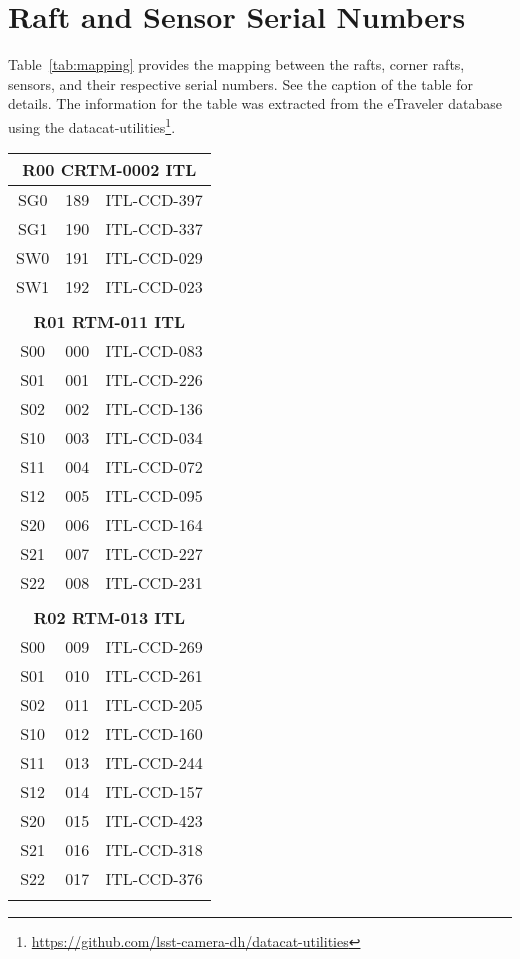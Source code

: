 \appendix
\section{Raft and Sensor Serial Numbers}
Table~\ref{tab:mapping} provides the mapping between the rafts, corner rafts, sensors, and their respective serial numbers.  See the caption of the table for details.  The information for the table was extracted from the eTraveler database using the datacat-utilities\footnote{\url{https://github.com/lsst-camera-dh/datacat-utilities}}.

\begin{longtable}{ccc}

\multicolumn{3}{c}{\bf R00  CRTM-0002  ITL} \\
\hline
  SG0 & 189 & ITL-CCD-397 \\
  SG1 & 190 & ITL-CCD-337 \\
  SW0 & 191 & ITL-CCD-029 \\
  SW1 & 192 & ITL-CCD-023 \\
 & & \\
\multicolumn{3}{c}{\bf R01  RTM-011  ITL} \\
\hline
  S00 & 000 & ITL-CCD-083 \\
  S01 & 001 & ITL-CCD-226 \\
  S02 & 002 & ITL-CCD-136 \\
  S10 & 003 & ITL-CCD-034 \\
  S11 & 004 & ITL-CCD-072 \\
  S12 & 005 & ITL-CCD-095 \\
  S20 & 006 & ITL-CCD-164 \\
  S21 & 007 & ITL-CCD-227 \\
  S22 & 008 & ITL-CCD-231 \\
 & & \\
\multicolumn{3}{c}{\bf R02  RTM-013  ITL} \\
\hline
  S00 & 009 & ITL-CCD-269 \\
  S01 & 010 & ITL-CCD-261 \\
  S02 & 011 & ITL-CCD-205 \\
  S10 & 012 & ITL-CCD-160 \\
  S11 & 013 & ITL-CCD-244 \\
  S12 & 014 & ITL-CCD-157 \\
  S20 & 015 & ITL-CCD-423 \\
  S21 & 016 & ITL-CCD-318 \\
  S22 & 017 & ITL-CCD-376 \\
 & & \\

\end{longtable}

